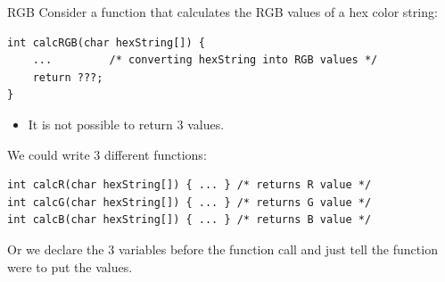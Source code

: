 \begin{frame}[fragile]{RGB}
	Consider a function that calculates the RGB values of a hex color string:
	\begin{lstlisting}[numbers=none]
int calcRGB(char hexString[]) {
	... 		/* converting hexString into RGB values */
	return ???;
}
\end{lstlisting}
	\begin{itemize}
		\item It is not possible to return 3 values.
	\end{itemize}
	We could write 3 different functions:
	\begin{lstlisting}[numbers=none]
int calcR(char hexString[]) { ... }	/* returns R value */
int calcG(char hexString[]) { ... }	/* returns G value */
int calcB(char hexString[]) { ... }	/* returns B value */
\end{lstlisting}
	Or we declare the 3 variables before the function call and just tell the function were to put the values.
\end{frame}
